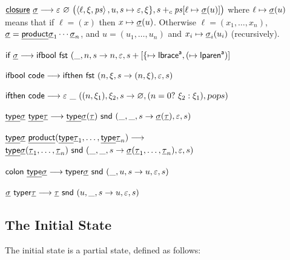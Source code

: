 \documentclass{llncs}
\begin{document}
\blist
    \item $\closure\ \tsig \longto \epsilon\ \varnothing\ \bigl(\gen{\ell,\xi,{\it ps}},u,s\mapsto\epsilon,\xi\},s+_c{\it ps}[\ell\mapsto\tsig(u)]\bigr)$ where $\ell\mapsto{\underline{\mathsf{\sigma}}}(u)$ means that if
        $\ell=(x)$ then $x\mapsto {\underline{\mathsf{\sigma}}}(u)$.
        Otherwise $\ell=(x_1,\dots,x_n)$, ${\underline{\mathsf{\sigma}}}=\underline{\mathsf{product}}{\underline{\mathsf{\sigma}}}_1\cdots{\underline{\mathsf{\sigma}}}_n$, and $u=(u_1,\dots,u_n)$ and $x_i\mapsto{\underline{\mathsf{\sigma}}}_i(u_i)$ (recursively).
\elist

\blist
    \item $\iif\ \tsig \longto \ifbooll\ \fst\ (\_,n,s\to n,\epsilon,s+[\{\mapsto\Lbrace\a,(\mapsto\lparen\a)]$
    \item $\ifbooll\ \code \longto \ifthen\ \fst\ (n,\xi,s\to(n,\xi),\epsilon,s)$
    \item $\ifthen\ \code \longto \epsilon\ \_\ ((n,\xi_1),\xi_2,s\to\varnothing,(n=0?\ \xi_2:\xi_1),\pop s)$
\elist

\blist
    \item $\underline{\mathsf{type}}{\underline{\mathsf{\sigma}}}\ \underline{\mathsf{type}}{\underline{\mathsf{\tau}}} \longrightarrow \underline{\mathsf{type}}{\underline{\mathsf{\sigma}}}({\underline{\mathsf{\tau}}})\ \mathsf{snd}\ (\_,\_,s\to {\underline{\mathsf{\sigma}}}({\underline{\mathsf{\tau}}}),\varepsilon,s)$
    \item $\tp\tsig\ \product(\tp\ttau_1,\dots,\tp\ttau_n) \longto$\hfil\break\null\hfill$\underline{\mathsf{type}}{\underline{\mathsf{\sigma}}}({\underline{\mathsf{\tau}}}_1,\dots,{\underline{\mathsf{\tau}}}_n)\ \mathsf{snd}\ (\_,\_,s\to {\underline{\mathsf{\sigma}}}({\underline{\mathsf{\tau}}}_1,\dots,{\underline{\mathsf{\tau}}}_n),\varepsilon,s)$
    \item $\ccolon\ \tp\tsig \longto \typer\tsig\ \snd\ (\_,u,s\to u,\epsilon,s)$
    \item $\tsig\ \typer\ttau \longto \ttau\ \snd\ (u,\_,s\to u,\epsilon,s)$
\elist

\subsection{The Initial State}

The initial state is a partial state, defined as follows:

\bigskip
\end{document}
